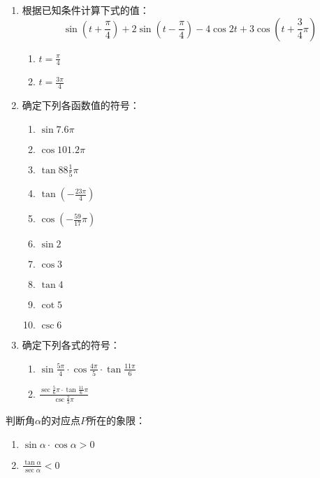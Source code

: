\begin{enumerate}
\item 根据已知条件计算下式的值：
$$\sin\left(t+\frac{\pi}{4}\right)+2\sin\left(t-\frac{\pi}{4}\right)-4\cos 2t+3\cos\left(t+\frac{3}{4}\pi\right)$$
\begin{multicols}{2}
\begin{enumerate}[(1)]
    \item $t=\frac{\pi}{4}$
    \item $t=\frac{3\pi}{4}$
\end{enumerate}
\end{multicols}

\item 确定下列各函数值的符号：
\begin{multicols}{3}
\begin{enumerate}[(1)]
    \item $\sin7.6\pi$
    \item $\cos 101.2\pi$
    \item $\tan88\frac{1}{5}\pi$
    \item $\tan\left(-\frac{23\pi}{4}\right)$
    \item $\cos\left(-\frac{59}{17}\pi\right)$
    \item $\sin 2$
    \item $\cos 3$
    \item $\tan 4$
    \item $\cot 5$
    \item $\csc 6$
\end{enumerate}
\end{multicols}

\item 确定下列各式的符号：
\begin{enumerate}[(1)]
    \item $\sin\frac{5\pi}{4}\cdot \cos \frac{4\pi}{5}\cdot \tan\frac{11\pi}{6}$
    \item $\frac{\sec\frac{5}{6}\pi\cdot \tan\frac{11}{6}\pi}{\csc\frac{2}{3}\pi}$
\end{enumerate}
\end{enumerate}

\begin{example}
判断角$\alpha$的对应点$P$所在的象限：
\begin{multicols}{2}
\begin{enumerate}[(1)]
    \item $\sin\alpha\cdot \cos\alpha>0$
    \item $\frac{\tan\alpha}{\sec\alpha}<0$
\end{enumerate}
\end{multicols}
\end{example}

